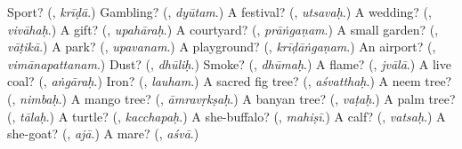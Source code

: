 \begin{tcolorbox}[breakable,colback=teal!4,colframe=teal!35!black,title={Before you move on}]
Sport? (\textbf{}, \emph{krīḍā}.) Gambling? (\textbf{}, \emph{dyūtam}.) A festival? (\textbf{}, \emph{utsavaḥ}.) A wedding? (\textbf{}, \emph{vivāhaḥ}.) A gift? (\textbf{}, \emph{upahāraḥ}.) A courtyard? (\textbf{}, \emph{prāṅgaṇam}.) A small garden? (\textbf{}, \emph{vāṭikā}.) A park? (\textbf{}, \emph{upavanam}.) A playground? (\textbf{}, \emph{krīḍāṅgaṇam}.) An airport? (\textbf{}, \emph{vimānapattanam}.) Dust? (\textbf{}, \emph{dhūliḥ}.) Smoke? (\textbf{}, \emph{dhūmaḥ}.) A flame? (\textbf{}, \emph{jvālā}.) A live coal? (\textbf{}, \emph{aṅgāraḥ}.) Iron? (\textbf{}, \emph{lauham}.) A sacred fig tree? (\textbf{}, \emph{aśvatthaḥ}.) A neem tree? (\textbf{}, \emph{nimbaḥ}.) A mango tree? (\textbf{}, \emph{āmravṛkṣaḥ}.) A banyan tree? (\textbf{}, \emph{vaṭaḥ}.) A palm tree? (\textbf{}, \emph{tālaḥ}.) A turtle? (\textbf{}, \emph{kacchapaḥ}.) A she-buffalo? (\textbf{}, \emph{mahiṣī}.) A calf? (\textbf{}, \emph{vatsaḥ}.) A she-goat? (\textbf{}, \emph{ajā}.) A mare? (\textbf{}, \emph{aśvā}.)
\end{tcolorbox}
